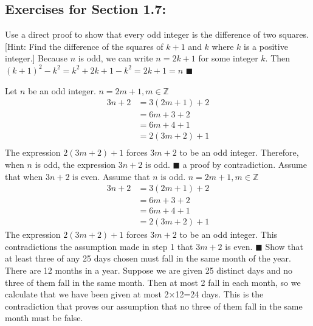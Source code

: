 \documentclass[12pt]{article}  %
\begin{document}
\subsection*{Exercises for Section 1.7:}     

\newline
Use a direct proof to show that every odd integer is the difference of two squares. [Hint: Find the difference of the squares of $k+1$ and $k$ where $k$ is a positive integer.]\newline
\newline
Because $n$ is odd, we can write $n=2k+1$ for some integer $k$.\newline
Then $(k+1)^2-k^2=k^2+2k+1-k^2=2k+1=n$\newline
$\blacksquare$

\newline
{}\newline
Let $n$ be an odd integer.\newline
$n=2m+1,m\in\mathbb{Z}$\newline
\begin{align*}
    3n+2    & =3(2m+1)+2\\
            & =6m+3+2   \\
            & =6m+4+1   \\
            & =2(3m+2)+1\\
\end{align*}
The expression $2(3m+2)+1$ forces $3m+2$ to be an odd integer.
Therefore, when $n$ is odd, the expression $3n+2$ is odd.\newline
$\blacksquare$\newline
\newline
a proof by contradiction.\newline
Assume that when $3n+2$ is even.\newline
Assume that $n$ is odd.
$n=2m+1,m\in\mathbb{Z}$\newline
\begin{align*}
    3n+2    & = 3(2m+1)+2 \\
            & = 6m+3+2    \\
            & = 6m+4+1    \\
            & = 2(3m+2)+1
\end{align*}
The expression $2(3m+2)+1$ forces $3m+2$ to be an odd integer.\newline
This contradictions the assumption made in step 1 that $3m+2$ is even.\newline
$\blacksquare$
\clearpage
{}
Show that at least three of any 25 days chosen must fall in the same month of the year.\newline
There are 12 months in a year.\newline
Suppose we are given 25 distinct days and no three of them fall in the same month.\newline
Then at most 2 fall in each month, so we calculate that we have been given at most 2×12=24 days.\newline
This is the contradiction that proves our assumption that no three of them fall in the same month must be false.
\end{document}
